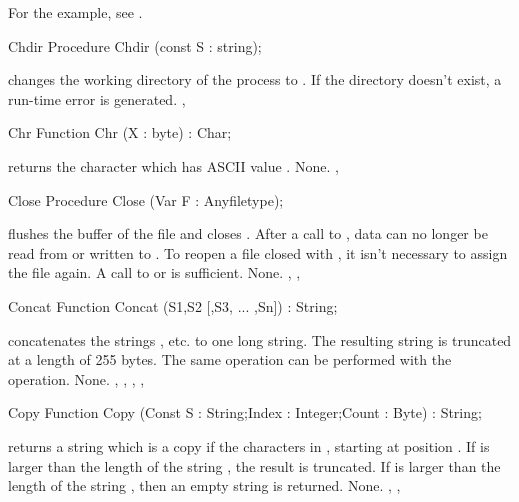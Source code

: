 \documentclass{report}
\begin{document}
For the example, see .
\begin{procedure}{Chdir}
\Declaration
Procedure Chdir (const S : string);

\Description
{} changes the working directory of the process to .
\Errors
If the directory  doesn't exist, a run-time error is generated.
\SeeAlso
{}, 
\end{procedure}
\html{}
\begin{function}{Chr}
\Declaration
Function Chr (X : byte) : Char;

\Description
{} returns the character which has ASCII value .
\Errors
None.
\SeeAlso
{},
\end{function}
\html{}
\begin{procedure}{Close}
\Declaration
Procedure Close (Var F : Anyfiletype);

\Description
{} flushes the buffer of the file  and closes .
After a call to , data can no longer be read from or written to
.
To reopen a file closed with , it isn't necessary to assign the
file again. A call to  or  is sufficient.
\Errors
None.
\SeeAlso
{}, , 
\end{procedure}
\html{}
\begin{function}{Concat}
\Declaration
Function Concat (S1,S2 [,S3, ... ,Sn]) : String;

\Description
{} concatenates the strings , etc. to one long
string. The resulting string is truncated at a length of 255 bytes.
The same operation can be performed with the \var{+} operation.
\Errors
None.
\SeeAlso
{}, , , , 
\end{function}
\html{}
\begin{function}{Copy}
\Declaration
Function Copy (Const S : String;Index : Integer;Count : Byte) : String;

\Description
{} returns a string which is a copy if the  characters
in , starting at position . If  is larger than
the length of the string , the result is truncated.
If  is larger than the length of the string , then an
empty string is returned.
\Errors
None.
\SeeAlso
{}, , 
\end{function}
\end{document}
